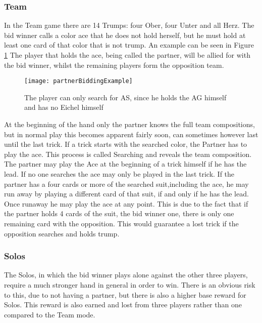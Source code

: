 \subsubsection{Team}
In the Team game there are 14 Trumps: four Ober, four Unter and all Herz.
\newline
The bid winner calls a color ace that he does not hold herself, but he must hold at least one card of that color
that is not trump.
An example can be seen in Figure \ref{fig:bidding}
The player that holds the ace, being called the partner, will be allied for with the bid winner, whilst the remaining
players form the opposition team.
\newline
\begin{figure}[h!]
    \texttt{[image: partnerBiddingExample]}\label{fig:figure}
    \caption{The player can only search for AS, since he holds the AG himself and has no Eichel himself}
    \label{fig:bidding}
\end{figure}
\newline
At the beginning of the hand only the partner knows the full team compositions, but in normal play this becomes
apparent fairly soon, can sometimes however last until the last trick.
If a trick starts with the searched color, the Partner has to play the ace.
This process is called Searching and reveals the team composition.
\newline
The partner may play the Ace at the beginning of a trick himself if he has the lead.
If no one searches the ace may only be played in the last trick.
If the partner has a four cards or more of the searched suit,including the ace, he may run away by playing a different
card of that suit, if and only if he has the lead.
Once runaway he may play the ace at any point.
This is due to the fact that if the partner holds 4 cards of the suit, the bid winner one, there is only one remaining
card with the opposition.
This would guarantee a lost trick if the opposition searches and holds trump.

\subsubsection{Solos}
The Solos, in which the bid winner plays alone against the other three players, require a much stronger hand in general
in order to win.
There is an obvious risk to this, due to not having a partner, but there is also a higher base reward for Solos.
This reward is also earned and lost from three players rather than one compared to the Team mode.

